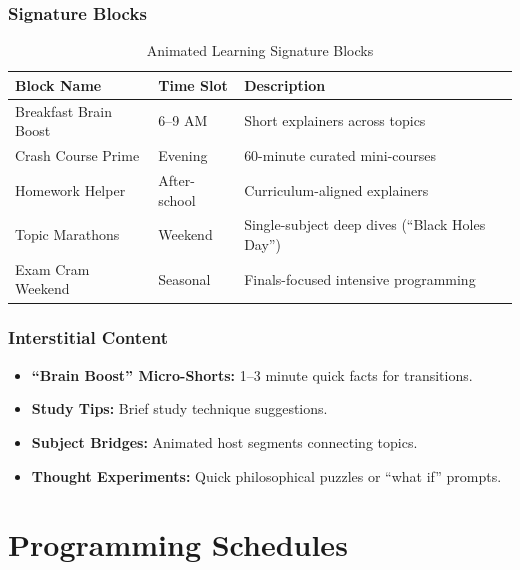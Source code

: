 \documentclass[12pt,letterpaper,twoside]{report}
\begin{document}
\subsection{Signature Blocks}

\begin{table}[H]
\centering
\caption{Animated Learning Signature Blocks}
\label{tab:learning-blocks}
\begin{tabular}{@{}L{4cm}L{2.5cm}L{7cm}@{}}
\toprule
\textbf{Block Name} & \textbf{Time Slot} & \textbf{Description} \\
\midrule
Breakfast Brain Boost & 6--9 AM & Short explainers across topics \\
\addlinespace
Crash Course Prime & Evening & 60-minute curated mini-courses \\
\addlinespace
Homework Helper & After-school & Curriculum-aligned explainers \\
\addlinespace
Topic Marathons & Weekend & Single-subject deep dives (``Black Holes Day'') \\
\addlinespace
Exam Cram Weekend & Seasonal & Finals-focused intensive programming \\
\bottomrule
\end{tabular}
\end{table}

\subsection{Interstitial Content}

\begin{itemize}[leftmargin=1.5cm]
    \item \textbf{``Brain Boost'' Micro-Shorts:} 1--3 minute quick facts for transitions.
    \item \textbf{Study Tips:} Brief study technique suggestions.
    \item \textbf{Subject Bridges:} Animated host segments connecting topics.
    \item \textbf{Thought Experiments:} Quick philosophical puzzles or ``what if'' prompts.
\end{itemize}

\chapter{Programming Schedules}
\label{ch:schedules}
\end{document}
